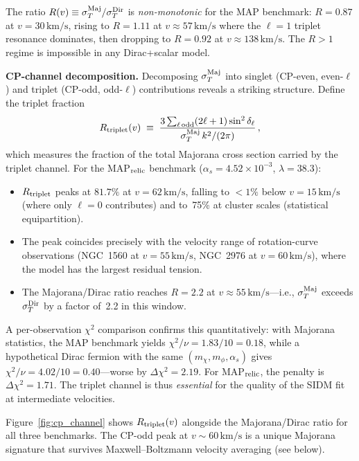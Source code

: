 \documentclass[aps,prd,twocolumn,superscriptaddress,nofootinbib]{revtex4-2}
\newcommand{\kms}{\,\text{km/s}}
\newcommand{\mchi}{m_\chi}
\newcommand{\mphi}{m_\phi}
\newcommand{\lam}{\lambda}
\begin{document}
The ratio $R(v)\equiv\sigma_T^{\rm Maj}/\sigma_T^{\rm Dir}$ is
\emph{non-monotonic} for the MAP benchmark: $R=0.87$ at
$v=30\kms$, rising to $R=1.11$ at $v\approx 57\kms$ where
the $\ell=1$ triplet resonance dominates, then dropping to
$R=0.92$ at $v\approx 138\kms$.  The $R>1$ regime is
impossible in any Dirac+scalar model.

\textbf{CP-channel decomposition.}  Decomposing $\sigma_T^{\rm Maj}$
into singlet (CP-even, even-$\ell$) and triplet (CP-odd, odd-$\ell$)
contributions reveals a striking structure.  Define the triplet
fraction
\begin{equation}\label{eq:R_triplet}
  R_{\rm triplet}(v)
  \;\equiv\;
  \frac{3\sum_{\ell\,\text{odd}}(2\ell+1)\sin^{2}\delta_\ell}
       {\sigma_T^{\rm Maj}\,k^{2}/(2\pi)}\,,
\end{equation}
which measures the fraction of the total Majorana cross section
carried by the triplet channel.  For the MAP$_{\rm relic}$ benchmark
($\alpha_s=4.52\times 10^{-3}$, $\lam=38.3$):

\begin{itemize}
  \item $R_{\rm triplet}$ peaks at $\mathbf{81.7\%}$ at
        $v=62\kms$, falling to $<1\%$ below $v=15\kms$
        (where only $\ell=0$ contributes) and to~75\%
        at cluster scales (statistical equipartition).
  \item The peak coincides precisely with the velocity range of
        rotation-curve observations (NGC~1560 at $v=55\kms$,
        NGC~2976 at $v=60\kms$), where the model has the
        largest residual tension.
  \item The Majorana/Dirac ratio reaches $R=2.2$ at
        $v\approx 55\kms$---i.e., $\sigma_T^{\rm Maj}$ exceeds
        $\sigma_T^{\rm Dir}$ by a factor of~2.2 in this window.
\end{itemize}

\noindent A per-observation $\chi^{2}$ comparison confirms this
quantitatively: with Majorana statistics, the MAP benchmark yields
$\chi^{2}/\nu = 1.83/10 = 0.18$, while a hypothetical Dirac fermion
with the same $(\mchi,\mphi,\alpha_s)$ gives
$\chi^{2}/\nu = 4.02/10 = 0.40$---worse by $\Delta\chi^{2}=2.19$.
For MAP$_{\rm relic}$, the penalty is $\Delta\chi^{2}=1.71$.  The
triplet channel is thus \emph{essential} for the quality of the SIDM
fit at intermediate velocities.

Figure~\ref{fig:cp_channel} shows $R_{\rm triplet}(v)$ alongside
the Majorana/Dirac ratio for all three benchmarks.  The CP-odd peak
at $v\sim 60\kms$ is a unique Majorana signature that survives
Maxwell--Boltzmann velocity averaging (see below).
\end{document}

